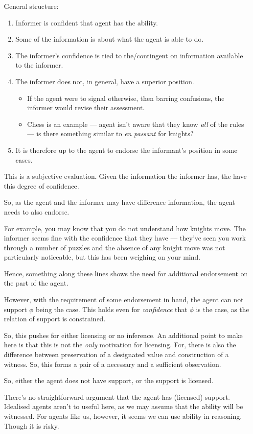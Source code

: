 \documentclass[10pt]{article}
\begin{document}
\begin{note}
  General structure:
  \begin{enumerate}
  \item Informer is confident that agent has the ability.
  \item Some of the information is about what the agent is able to do.
  \item The informer's confidence is tied to the/contingent on information available to the informer.
  \item The informer does not, in general, have a superior position.
    \begin{itemize}
    \item If the agent were to signal otherwise, then barring confusions, the informer would revise their assessment.
    \item Chess is an example --- agent isn't aware that they know \emph{all} of the rules --- is there something similar to \emph{en passant} for knights?
    \end{itemize}
  \item It is therefore up to the agent to endorse the informant's position in some cases.
  \end{enumerate}
\end{note}

\begin{note}
  This is a subjective evaluation.
  Given the information the informer has, the have this degree of confidence.

  So, as the agent and the informer may have difference information, the agent needs to also endorse.

  For example, you may know that you do not understand how knights move.
  The informer seems fine with the confidence that they have --- they've seen you work through a number of puzzles and the absence of any knight move was not particularly noticeable, but this has been weighing on your mind.

  Hence, something along these lines shows the need for additional endorsement on the part of the agent.

  However, with the requirement of some endorsement in hand, the agent can not support \(\phi\) being the case.
  This holds even for \emph{confidence} that \(\phi\) is the case, as the relation of support is constrained.

  So, this pushes for either licensing or no inference.
  An additional point to make here is that this is not the \emph{only} motivation for licensing.
  For, there is also the difference between preservation of a designated value and construction of a witness.
  So, this forms a pair of a necessary and a sufficient observation.

  So, either the agent does not have support, or the support is licensed.

  There's no straightforward argument that the agent has (licensed) support.
  Idealised agents aren't to useful here, as we may assume that the ability will be witnessed.
  For agents like us, however, it seems we can use ability in reasoning.
  Though it is risky.
\end{note}
\end{document}
